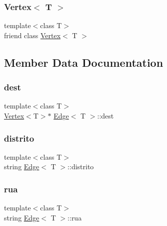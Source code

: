 \subsubsection{\texorpdfstring{Vertex$<$ T $>$}{Vertex< T >}}
{\footnotesize\ttfamily template$<$class T$>$ \\
friend class \hyperlink{class_vertex}{Vertex}$<$ T $>$\hspace{0.3cm}{\ttfamily [friend]}}



\subsection{Member Data Documentation}
\mbox{\label{class_edge_ae4d65678b91bd9d814af4720ad87cd0c}} 
\subsubsection{\texorpdfstring{dest}{dest}}
{\footnotesize\ttfamily template$<$class T$>$ \\
\hyperlink{class_vertex}{Vertex}$<$T$>$$\ast$ \hyperlink{class_edge}{Edge}$<$ T $>$\+::dest\hspace{0.3cm}{\ttfamily [private]}}

\mbox{\label{class_edge_a5853093c36a4a3f483ce705d99f87f67}} 
\subsubsection{\texorpdfstring{distrito}{distrito}}
{\footnotesize\ttfamily template$<$class T$>$ \\
string \hyperlink{class_edge}{Edge}$<$ T $>$\+::distrito\hspace{0.3cm}{\ttfamily [private]}}

\mbox{\label{class_edge_abbe53eb540c289810569a5d67691317d}} 
\subsubsection{\texorpdfstring{rua}{rua}}
{\footnotesize\ttfamily template$<$class T$>$ \\
string \hyperlink{class_edge}{Edge}$<$ T $>$\+::rua\hspace{0.3cm}{\ttfamily [private]}}

